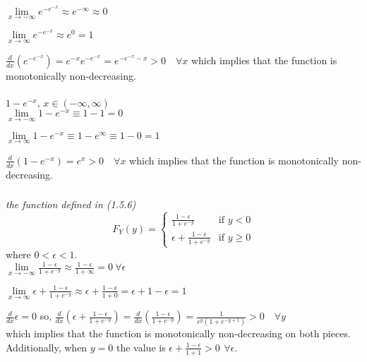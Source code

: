 \documentclass[12pt]{amsart}
\begin{document}
	$\lim\limits_{x\rightarrow-\infty} e^{-e^{-x}} \approx e^{-\infty} \approx 0$
	
	$\lim\limits_{x\rightarrow\infty} e^{-e^{-x}} \approx e^{0} = 1$
	
	$ \frac{d}{dx}\left( e^{-e^{-x}} \right) = e^{-x}e^{-e^{-x}} = e^{-e^{-x}-x} >0\quad\forall x $ which implies that the function is monotonically non-decreasing. \\
	
	\subsubsection{} \( 1-e^{-x},\, x\in(-\infty,\infty) \) \\
	
	$\lim\limits_{x\rightarrow-\infty} 1-e^{-x} \equiv 1-1  = 0$
	
	$\lim\limits_{x\rightarrow\infty} 1-e^{-x} \equiv 1-e^\infty \equiv 1-0 = 1$
	
	$ \frac{d}{dx}\left( 1-e^{-x} \right) = e^x >0\quad\forall x$ which implies that the function is monotonically non-decreasing. \\
	
	\subsubsection{} \textit{the function defined in (1.5.6)} 
	\[F_Y(y) = \begin{cases}
		\frac{1-\epsilon}{1+e^{-y}} & \text{if } y<0 \\
		\epsilon + \frac{1-\epsilon}{1+e^{-y}} & \text{if } y\geq0
	\end{cases} \]
	where $0<\epsilon<1$.\\
	
	$\lim\limits_{x\rightarrow-\infty} \frac{1-\epsilon}{1+e^{-y}} \approx \frac{1-\epsilon}{1+\infty} = 0\ \forall\epsilon$
	
	$\lim\limits_{x\rightarrow\infty} \epsilon + \frac{1-\epsilon}{1+e^{-y}} \approx \epsilon+ \frac{1-\epsilon}{1+0} = \epsilon + 1 -\epsilon = 1$
	
	$\frac{d}{dx}\epsilon = 0$ so,
	$ \frac{d}{dx}\left( \epsilon + \frac{1-\epsilon}{1+e^{-y}} \right) = \frac{d}{dx}\left(\frac{1-\epsilon}{1+e^{-y}} \right) =
	\frac{1}{e^y(1+e^{-y+1})} >0\quad\forall y$ \\
	which implies that the function is monotonically non-decreasing on both pieces. 
	Additionally, when $y=0$ the value is $\epsilon+\frac{1-\epsilon}{1+1} > 0\,\ \forall\epsilon$.\\
	
\end{document}
